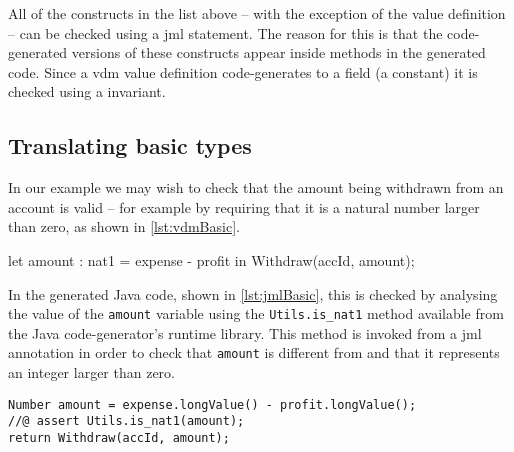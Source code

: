 All of the constructs in the list above -- with the exception of the
value definition -- can be checked using a \ac{jml} 
statement. The reason for this is that the code-generated versions of
these constructs appear inside methods in the generated code. Since a
\ac{vdm} value definition code-generates to a  
 field (a constant) it is checked using a 
invariant.

\subsection{Translating basic types}
\label{sec:basic}

In our example we may wish to check that the amount being withdrawn
from an account is valid -- for example by requiring that it is a
natural number larger than zero, as shown in \autoref{lst:vdmBasic}.

\begin{vdmsl}[style=customVdm,caption={Use of explicit type annotation
to ensure that a valid amount is being
withdrawn.},label={lst:vdmBasic}]
let amount : nat1 = expense - profit
in
  Withdraw(accId, amount);
\end{vdmsl}

In the generated Java code, shown in \autoref{lst:jmlBasic}, this is
checked by analysing the value of the \texttt{amount} variable using
the \texttt{Utils.is\_nat1} method available from the Java
code-generator's runtime library. This method is invoked from a
\ac{jml} annotation in order to check that \texttt{amount} is
different from  and that it represents an integer larger than
zero.

\begin{lstlisting}[style=customJml,caption={Use of \ac{jml} to check
that a valid amount is being withdrawn.},label={lst:jmlBasic}]
Number amount = expense.longValue() - profit.longValue();
//@ assert Utils.is_nat1(amount);
return Withdraw(accId, amount);
\end{lstlisting}


